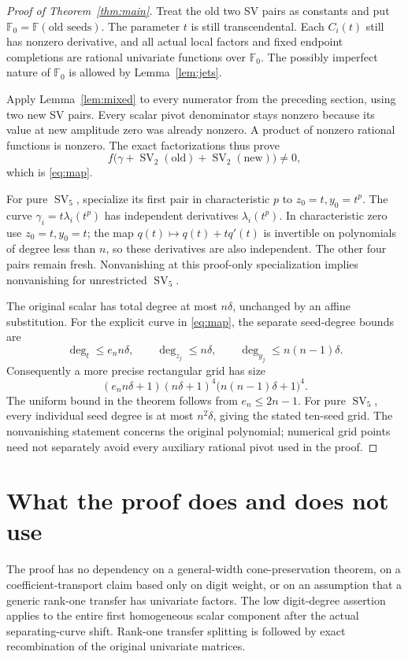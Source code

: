 \documentclass[11pt]{article}
\newcommand{\F}{\mathbb F}
\newcommand{\SV}{\operatorname{SV}}
\begin{document}
\begin{proof}[Proof of Theorem~\ref{thm:main}]
Treat the old two SV pairs as constants and put
\(\F_0=\F(\text{old seeds})\). The parameter \(t\) is still
transcendental. Each \(C_i(t)\) still has nonzero derivative, and all
actual local factors and fixed endpoint completions are rational
univariate functions over \(\F_0\). The possibly imperfect nature of
\(\F_0\) is allowed by Lemma~\ref{lem:jets}.

Apply Lemma~\ref{lem:mixed} to every numerator from the preceding
section, using two new SV pairs. Every scalar pivot denominator stays
nonzero because its value at new amplitude zero was already nonzero.
A product of nonzero rational functions is nonzero. The exact
factorizations thus prove
\[
 f\bigl(\gamma+\SV_2(\text{old})+\SV_2(\text{new})\bigr)\ne0,
\]
which is \eqref{eq:map}.

For pure \(\SV_5\), specialize its first pair in characteristic \(p\)
to \(z_0=t,y_0=t^p\). The curve
\(\gamma_i=t\lambda_i(t^p)\) has independent derivatives
\(\lambda_i(t^p)\). In characteristic zero use \(z_0=t,y_0=t\);
the map \(q(t)\mapsto q(t)+tq'(t)\) is invertible on polynomials of
degree less than \(n\), so these derivatives are also independent.
The other four pairs remain fresh. Nonvanishing at this proof-only
specialization implies nonvanishing for unrestricted \(\SV_5\).

The original scalar has total degree at most \(n\delta\), unchanged
by an affine substitution. For the explicit curve in \eqref{eq:map},
the separate seed-degree bounds are
\[
 \deg_t\le e_n n\delta,\qquad
 \deg_{z_j}\le n\delta,\qquad
 \deg_{y_j}\le n(n-1)\delta.
\]
Consequently a more precise rectangular grid has size
\[
 (e_n n\delta+1)(n\delta+1)^4
                  \bigl(n(n-1)\delta+1\bigr)^4.
\]
The uniform bound in the theorem follows from \(e_n\le2n-1\).
For pure \(\SV_5\), every individual seed degree is at most
\(n^2\delta\), giving the stated ten-seed grid. The nonvanishing
statement concerns the original polynomial; numerical grid points
need not separately avoid every auxiliary rational pivot used in
the proof.
\end{proof}

\section{What the proof does and does not use}

The proof has no dependency on a general-width cone-preservation theorem,
on a coefficient-transport claim based only on digit weight, or on an
assumption that a generic rank-one transfer has univariate factors.
The low digit-degree assertion applies to the entire first homogeneous
scalar component after the actual separating-curve shift. Rank-one
transfer splitting is followed by exact recombination of the original
univariate matrices.
\end{document}
